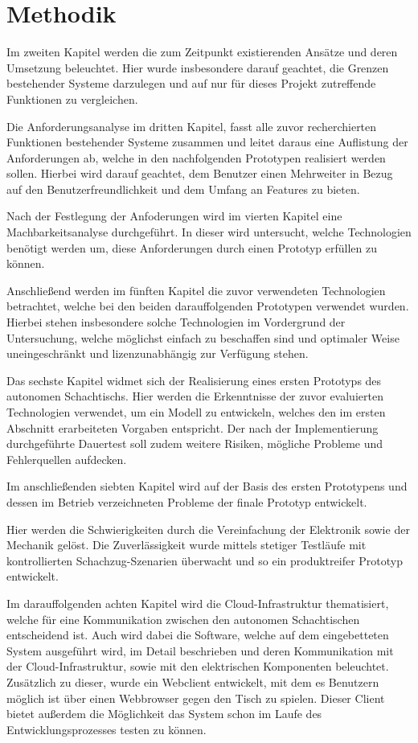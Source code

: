 \hypertarget{methodik}{%
\section{Methodik}\label{methodik}}

Im zweiten Kapitel werden die zum Zeitpunkt existierenden Ansätze und
deren Umsetzung beleuchtet. Hier wurde insbesondere darauf geachtet, die
Grenzen bestehender Systeme darzulegen und auf nur für dieses Projekt
zutreffende Funktionen zu vergleichen.

Die Anforderungsanalyse im dritten Kapitel, fasst alle zuvor
recherchierten Funktionen bestehender Systeme zusammen und leitet daraus
eine Auflistung der Anforderungen ab, welche in den nachfolgenden
Prototypen realisiert werden sollen. Hierbei wird darauf geachtet, dem
Benutzer einen Mehrweiter in Bezug auf den Benutzerfreundlichkeit und
dem Umfang an Features zu bieten.

Nach der Festlegung der Anfoderungen wird im vierten Kapitel eine
Machbarkeitsanalyse durchgeführt. In dieser wird untersucht, welche
Technologien benötigt werden um, diese Anforderungen durch einen
Prototyp erfüllen zu können.

Anschließend werden im fünften Kapitel die zuvor verwendeten
Technologien betrachtet, welche bei den beiden darauffolgenden
Prototypen verwendet wurden. Hierbei stehen insbesondere solche
Technologien im Vordergrund der Untersuchung, welche möglichst einfach
zu beschaffen sind und optimaler Weise uneingeschränkt und
lizenzunabhängig zur Verfügung stehen.

Das sechste Kapitel widmet sich der Realisierung eines ersten Prototyps
des autonomen Schachtischs. Hier werden die Erkenntnisse der zuvor
evaluierten Technologien verwendet, um ein Modell zu entwickeln, welches
den im ersten Abschnitt erarbeiteten Vorgaben entspricht. Der nach der
Implementierung durchgeführte Dauertest soll zudem weitere Risiken,
mögliche Probleme und Fehlerquellen aufdecken.

Im anschließenden siebten Kapitel wird auf der Basis des ersten
Prototypens und dessen im Betrieb verzeichneten Probleme der finale
Prototyp entwickelt.

Hier werden die Schwierigkeiten durch die Vereinfachung der Elektronik
sowie der Mechanik gelöst. Die Zuverlässigkeit wurde mittels stetiger
Testläufe mit kontrollierten Schachzug-Szenarien überwacht und so ein
produktreifer Prototyp entwickelt.

Im darauffolgenden achten Kapitel wird die Cloud-Infrastruktur
thematisiert, welche für eine Kommunikation zwischen den autonomen
Schachtischen entscheidend ist. Auch wird dabei die Software, welche auf
dem eingebetteten System ausgeführt wird, im Detail beschrieben und
deren Kommunikation mit der Cloud-Infrastruktur, sowie mit den
elektrischen Komponenten beleuchtet. Zusätzlich zu dieser, wurde ein
Webclient entwickelt, mit dem es Benutzern möglich ist über einen
Webbrowser gegen den Tisch zu spielen. Dieser Client bietet außerdem die
Möglichkeit das System schon im Laufe des Entwicklungsprozesses testen
zu können.

